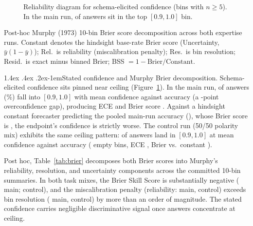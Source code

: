 \documentclass[11pt]{article}
\makeatletter
\renewcommand\paragraph{\@startsection{paragraph}{4}{\z@}%
  {1.4ex \@plus .4ex \@minus .2ex}{-1em}{\normalfont\normalsize\bfseries}}
\makeatother
\begin{document}
\begin{figure}[!tb]
\centering

\caption{Reliability diagram for schema-elicited confidence (bins with $n \ge 5$). In the main run, \tiCalTopN{} of \tiCalN{} answers sit in the top $[0.9, 1.0]$ bin.}
\label{fig:rel}
\end{figure}

\begin{table}[!tb]
\centering\small

\caption{Post-hoc Murphy (1973) 10-bin Brier score decomposition across both expertise runs. Constant denotes the hindsight base-rate Brier score (Uncertainty, $\bar{y}(1-\bar{y})$); Rel.\ is reliability (miscalibration penalty); Res.\ is bin resolution; Resid.\ is exact minus binned Brier; BSS $= 1 - \text{Brier}/\text{Constant}$.}
\label{tab:brier}
\end{table}

\paragraph{Stated confidence and Murphy Brier decomposition.}
Schema-elicited confidence sits pinned near ceiling (Figure~\ref{fig:rel}). In the main run, \tiCalTopN{} of \tiCalN{} answers (\tiCalTopShare{}\%) fall into $[0.9, 1.0]$ with mean confidence \tiCalTopConf{} against accuracy \tiCalTopAcc{} (a \tiCalTopGap{}-point overconfidence gap), producing ECE \tiEce{} and Brier score \tiBrier{}. Against a hindsight constant forecaster predicting the pooled main-run accuracy (\tiCalAccAll{}), whose Brier score is \tiBrierBase{}, the endpoint's confidence is strictly worse. The control run (50/50 polarity mix) exhibits the same ceiling pattern: \tiCtlCalTopN{} of \tiCtlCalN{} answers land in $[0.9, 1.0]$ at mean confidence \tiCtlCalTopConf{} against accuracy \tiCtlCalTopAcc{} (\tiCtlEmptyBins{} empty bins, ECE \tiCtlEce{}, Brier \tiCtlBrier{} vs.\ constant \tiPostCtlUnc{}).

Post hoc, Table~\ref{tab:brier} decomposes both Brier scores into Murphy's~\citep{murphy1973brier} reliability, resolution, and uncertainty components across the committed 10-bin summaries. In both task mixes, the Brier Skill Score is substantially negative (\tiPostMainBss{} main; \tiPostCtlBss{} control), and the miscalibration penalty (reliability: \tiPostMainRel{} main, \tiPostCtlRel{} control) exceeds bin resolution (\tiPostMainRes{} main, \tiPostCtlRes{} control) by more than an order of magnitude. The stated confidence carries negligible discriminative signal once answers concentrate at ceiling.
\end{document}
